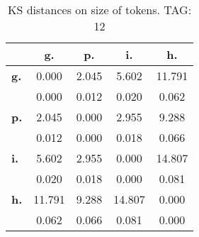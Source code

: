\begin{table}[h!]
\begin{center}
\begin{tabular}{| l || c | c | c | c |}\hline
 & {\bf g.} & {\bf p.} & {\bf i.} & {\bf h.} \\\hline\hline
{\bf g.} & 0.000 & 2.045 & 5.602 & 11.791 \\
{\bf } & 0.000 & 0.012 & 0.020 & 0.062 \\\hline
{\bf p.} & 2.045 & 0.000 & 2.955 & 9.288 \\
{\bf } & 0.012 & 0.000 & 0.018 & 0.066 \\\hline
{\bf i.} & 5.602 & 2.955 & 0.000 & 14.807 \\
{\bf } & 0.020 & 0.018 & 0.000 & 0.081 \\\hline
{\bf h.} & 11.791 & 9.288 & 14.807 & 0.000 \\
{\bf } & 0.062 & 0.066 & 0.081 & 0.000 \\\hline
\end{tabular}
\caption{KS distances on size of tokens. TAG: 12}
\end{center}
\end{table}